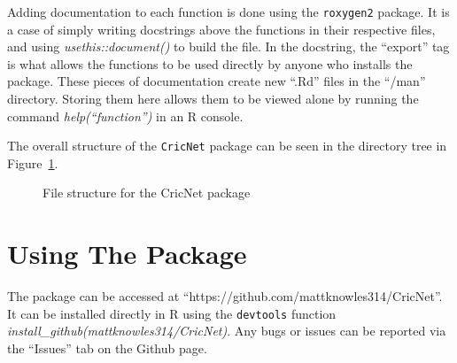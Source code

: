 Adding documentation to each function is done using the \verb|roxygen2| package. It is a case of simply writing docstrings above the functions in their respective files, and using \textit{usethis::document()} to build the file. In the docstring, the ``export'' tag is what allows the functions to be used directly by anyone who installs the package.  
These pieces of documentation create new ``.Rd'' files in the ``/man'' directory. Storing them here allows them to be viewed alone by running the command \textit{help(``function'')} in an R console. 

The overall structure of the \verb|CricNet| package can be seen in the directory tree in Figure~\ref{cricnetstruct}.\\

\begin{figure}[ht]
\caption{File structure for the CricNet package}

    

\label{cricnetstruct}
\end{figure}

\section{Using The Package}
The package can be accessed at ``https://github.com/mattknowles314/CricNet''. It can be installed directly in R using the \verb|devtools| function \textit{install\_github(mattknowles314/CricNet)}. Any bugs or issues can be reported via the ``Issues'' tab on the Github page. 
